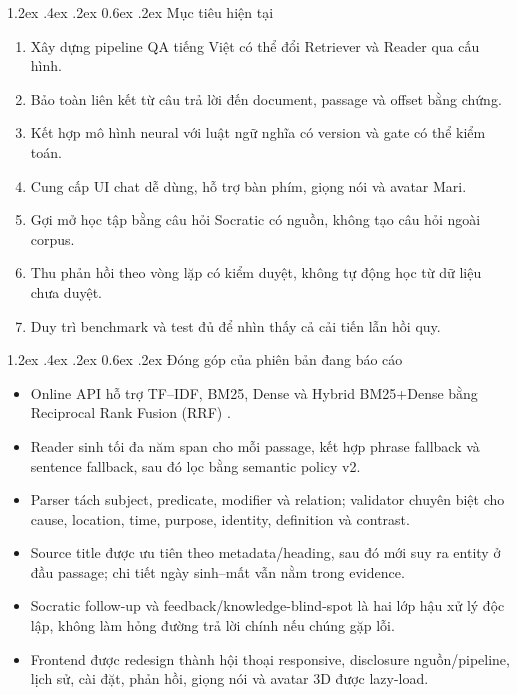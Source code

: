 \documentclass[12pt,a4paper,oneside]{report}
\makeatletter
\renewcommand\section{\@startsection {section}{1}{\z@}%
  {1.2ex \@plus .4ex \@minus .2ex}%
  {0.6ex \@plus .2ex}%
  {\normalfont\Large\bfseries}}
\makeatother
\begin{document}
\section{Mục tiêu hiện tại}
\begin{enumerate}
  \item Xây dựng pipeline QA tiếng Việt có thể đổi Retriever và Reader qua cấu hình.
  \item Bảo toàn liên kết từ câu trả lời đến document, passage và offset bằng chứng.
  \item Kết hợp mô hình neural với luật ngữ nghĩa có version và gate có thể kiểm toán.
  \item Cung cấp UI chat dễ dùng, hỗ trợ bàn phím, giọng nói và avatar Mari.
  \item Gợi mở học tập bằng câu hỏi Socratic có nguồn, không tạo câu hỏi ngoài corpus.
  \item Thu phản hồi theo vòng lặp có kiểm duyệt, không tự động học từ dữ liệu chưa duyệt.
  \item Duy trì benchmark và test đủ để nhìn thấy cả cải tiến lẫn hồi quy.
\end{enumerate}

\section{Đóng góp của phiên bản đang báo cáo}
\begin{itemize}
  \item Online API hỗ trợ TF--IDF, BM25, Dense và Hybrid BM25+Dense bằng Reciprocal
  Rank Fusion (RRF) \cite{cormack2009rrf}.
  \item Reader sinh tối đa năm span cho mỗi passage, kết hợp phrase fallback và
  sentence fallback, sau đó lọc bằng semantic policy v2.
  \item Parser tách subject, predicate, modifier và relation; validator chuyên biệt
  cho cause, location, time, purpose, identity, definition và contrast.
  \item Source title được ưu tiên theo metadata/heading, sau đó mới suy ra entity ở
  đầu passage; chi tiết ngày sinh--mất vẫn nằm trong evidence.
  \item Socratic follow-up và feedback/knowledge-blind-spot là hai lớp hậu xử lý độc
  lập, không làm hỏng đường trả lời chính nếu chúng gặp lỗi.
  \item Frontend được redesign thành hội thoại responsive, disclosure nguồn/pipeline,
  lịch sử, cài đặt, phản hồi, giọng nói và avatar 3D được lazy-load.
\end{itemize}
\end{document}
